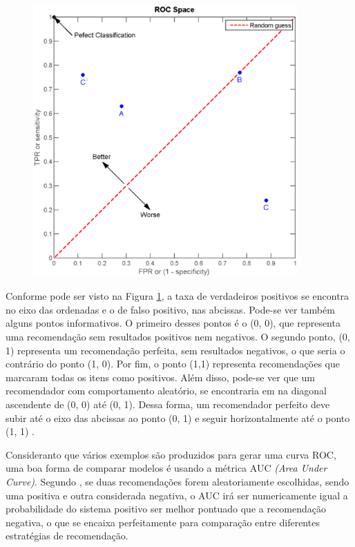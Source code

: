 \begin{figure}[h]
  \centering
  \includegraphics[width=0.9\textwidth]{figuras/curva_roc.eps}
  \caption{}
  \label{fig:curva_roc}
\end{figure}

Conforme pode ser visto na Figura \ref{fig:curva_roc}, a taxa de verdadeiros
positivos se encontra no eixo das ordenadas e o de falso positivo, nas
abcissas. Pode-se ver também alguns pontos informativos. O primeiro desses
pontos é o (0, 0), que representa uma recomendação sem resultados positivos nem
negativos. O segundo ponto, (0, 1) representa um recomendação perfeita, sem
resultados negativos, o que seria o contrário do ponto (1, 0). Por fim, o ponto
(1,1) representa recomendações que marcaram todas os itens como positivos. Além
disso, pode-se ver que um recomendador com comportamento aleatório, se
encontraria em na diagonal ascendente de (0, 0) até (0, 1). Dessa forma, um
recomendador perfeito deve subir até o eixo das abcissas ao ponto (0, 1) e
seguir horizontalmente até o ponto (1, 1) \cite{araujo2011apprecommender}.

Consideranto que vários exemplos são produzidos para gerar uma curva ROC, uma
boa forma de comparar modelos é usando a métrica AUC \textit{(Area Under
Curve)}. Segundo \cite{herlocker2004evaluating}, se duas recomendações forem
aleatoriamente escolhidas, sendo uma positiva e outra considerada negativa, o
AUC irá ser numericamente igual a probabilidade do sistema positivo ser melhor
pontuado que a recomendação negativa, o que se encaixa perfeitamente para
comparação entre diferentes estratégias de recomendação.

